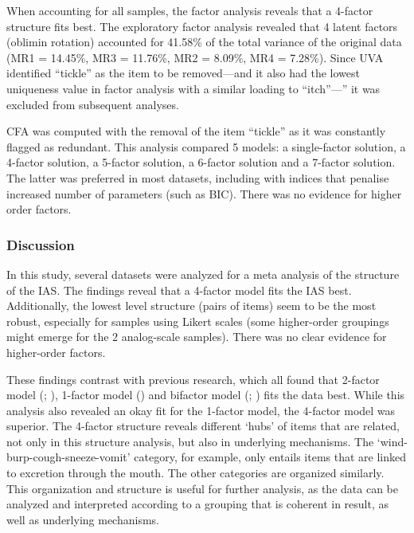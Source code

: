\documentclass[
  man,
  floatsintext,
  longtable,
  nolmodern,
  notxfonts,
  notimes,
  colorlinks=true,linkcolor=blue,citecolor=blue,urlcolor=blue]{apa7}
\begin{document}
When accounting for all samples, the factor analysis reveals that a
4-factor structure fits best. The exploratory factor analysis revealed
that 4 latent factors (oblimin rotation) accounted for 41.58\% of the
total variance of the original data (MR1 = 14.45\%, MR3 = 11.76\%, MR2 =
8.09\%, MR4 = 7.28\%). Since UVA identified ``tickle'' as the item to be
removed---and it also had the lowest uniqueness value in factor analysis
with a similar loading to ``itch''---'' it was excluded from subsequent
analyses.

CFA was computed with the removal of the item ``tickle'' as it was
constantly flagged as redundant. This analysis compared 5 models: a
single-factor solution, a 4-factor solution, a 5-factor solution, a
6-factor solution and a 7-factor solution. The latter was preferred in
most datasets, including with indices that penalise increased number of
parameters (such as BIC). There was no evidence for higher order
factors.

\subsubsection{Discussion}\label{discussion}

In this study, several datasets were analyzed for a meta analysis of the
structure of the IAS. The findings reveal that a 4-factor model fits the
IAS best. Additionally, the lowest level structure (pairs of items) seem
to be the most robust, especially for samples using Likert scales (some
higher-order groupings might emerge for the 2 analog-scale samples).
There was no clear evidence for higher-order factors.

These findings contrast with previous research, which all found that
2-factor model (;
), 1-factor model
() and bifactor model
(;
) fits the data best. While this
analysis also revealed an okay fit for the 1-factor model, the 4-factor
model was superior. The 4-factor structure reveals different `hubs' of
items that are related, not only in this structure analysis, but also in
underlying mechanisms. The `wind-burp-cough-sneeze-vomit' category, for
example, only entails items that are linked to excretion through the
mouth. The other categories are organized similarly. This organization
and structure is useful for further analysis, as the data can be
analyzed and interpreted according to a grouping that is coherent in
result, as well as underlying mechanisms.
\end{document}
